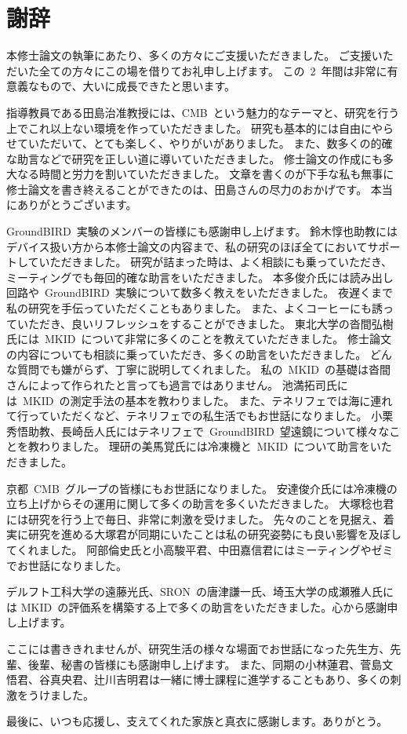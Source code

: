 \chapter{謝辞}

本修士論文の執筆にあたり、多くの方々にご支援いただきました。
ご支援いただいた全ての方々にこの場を借りてお礼申し上げます。
この~2~年間は非常に有意義なもので、大いに成長できたと思います。


指導教員である田島治准教授には、CMB~という魅力的なテーマと、研究を行う上でこれ以上ない環境を作っていただきました。
研究も基本的には自由にやらせていただいて、とても楽しく、やりがいがありました。
また、数多くの的確な助言などで研究を正しい道に導いていただきました。
修士論文の作成にも多大なる時間と労力を割いていただきました。
文章を書くのが下手な私も無事に修士論文を書き終えることができたのは、田島さんの尽力のおかげです。
本当にありがとうございます。

GroundBIRD~実験のメンバーの皆様にも感謝申し上げます。
鈴木惇也助教にはデバイス扱い方から本修士論文の内容まで、私の研究のほぼ全てにおいてサポートしていただきました。
研究が詰まった時は、よく相談にも乗っていただき、ミーティングでも毎回的確な助言をいただきました。
本多俊介氏には読み出し回路や~GroundBIRD~実験について数多く教えをいただきました。
夜遅くまで私の研究を手伝っていただくこともありました。
また、よくコーヒーにも誘っていただき、良いリフレッシュをすることができました。
東北大学の沓間弘樹氏には~MKID~について非常に多くのことを教えていただきました。
修士論文の内容についても相談に乗っていただき、多くの助言をいただきました。
どんな質問でも嫌がらず、丁寧に説明してくれました。
私の~MKID~の基礎は沓間さんによって作られたと言っても過言ではありません。
池満拓司氏には~MKID~の測定手法の基本を教わりました。
また、テネリフェでは海に連れて行っていただくなど、テネリフェでの私生活でもお世話になりました。
小栗秀悟助教、長崎岳人氏にはテネリフェで~GroundBIRD~望遠鏡について様々なことを教わりました。
理研の美馬覚氏には冷凍機と~MKID~について助言をいただきました。

京都~CMB~グループの皆様にもお世話になりました。
安達俊介氏には冷凍機の立ち上げからその運用に関して多くの助言を多くいただきました。
大塚稔也君には研究を行う上で毎日、非常に刺激を受けました。
先々のことを見据え、着実に研究を進める大塚君が同期にいたことは私の研究姿勢にも良い影響を及ぼしてくれました。
阿部倫史氏と小高駿平君、中田嘉信君にはミーティングやゼミでお世話になりました。

デルフト工科大学の遠藤光氏、SRON~の唐津謙一氏、埼玉大学の成瀬雅人氏には
MKID~の評価系を構築する上で多くの助言をいただきました。心から感謝申し上げます。

ここには書ききれませんが、研究生活の様々な場面でお世話になった先生方、先輩、後輩、秘書の皆様にも感謝申し上げます。
また、同期の小林蓮君、菅島文悟君、谷真央君、辻川吉明君は一緒に博士課程に進学することもあり、多くの刺激をうけました。

最後に、いつも応援し、支えてくれた家族と真衣に感謝します。ありがとう。